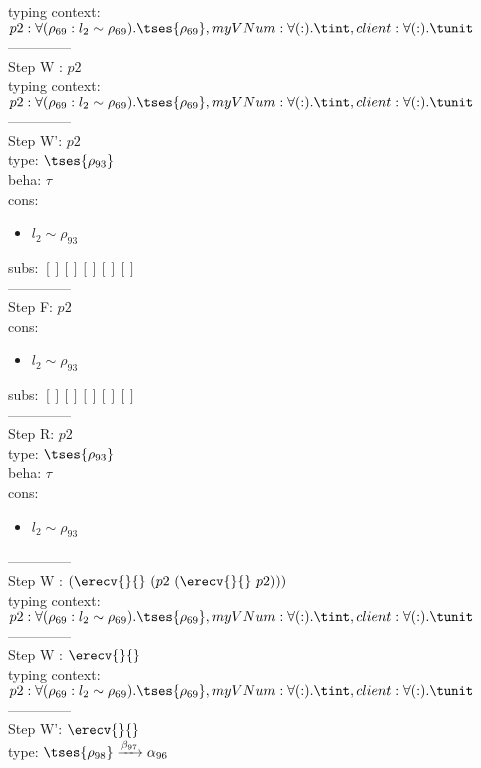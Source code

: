 \documentclass[12pt]{article}
\begin{document}
 typing context: $ p2:\forall (\rho_{69} : l_{2} \sim\rho_{69}).  \tses{ \rho_{69}}, myVNum:\forall ( : ). \tint, client:\forall ( : ). \tunit$ 
\\ --------------\\
Step W : $ p2 $\\
 typing context: $ p2:\forall (\rho_{69} : l_{2} \sim\rho_{69}).  \tses{ \rho_{69}}, myVNum:\forall ( : ). \tint, client:\forall ( : ). \tunit$ 
\\ --------------\\
Step W': $ p2 $\\
  type: $  \tses{ \rho_{93}} $ 
\\  beha: $ \tau $ 
\\  cons: \begin{itemize}
\item $ l_{2} \sim\rho_{93} $
\end{itemize} 
  subs:  $ [ ] [] [] [] [] $  
 \\--------------\\ 
Step F: $ p2 $
 \\ cons: \begin{itemize}
\item $ l_{2} \sim\rho_{93} $
\end{itemize}
 subs:  $ [ ] [] [] [] [] $ 
  \\--------------\\ 
Step R: $ p2 $\\
  type: $  \tses{ \rho_{93}} $ 
\\  beha: $ \tau $ 
\\  cons: \begin{itemize}
\item $ l_{2} \sim\rho_{93} $
\end{itemize} 
  --------------\\ 
Step W : $ (\erecv{}{}~(p2~(\erecv{}{}~p2))) $\\
 typing context: $ p2:\forall (\rho_{69} : l_{2} \sim\rho_{69}).  \tses{ \rho_{69}}, myVNum:\forall ( : ). \tint, client:\forall ( : ). \tunit$ 
\\ --------------\\
Step W : $ \erecv{}{} $\\
 typing context: $ p2:\forall (\rho_{69} : l_{2} \sim\rho_{69}).  \tses{ \rho_{69}}, myVNum:\forall ( : ). \tint, client:\forall ( : ). \tunit$ 
\\ --------------\\
Step W': $ \erecv{}{} $\\
  type: $  \tses{ \rho_{98}} \xrightarrow{\beta_{97}} \alpha_{96} $ 
\end{document}
